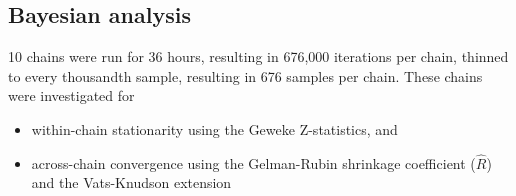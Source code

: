 \documentclass[]{article}
\begin{document}
\subsection{Bayesian analysis}
10 chains were run for 36 hours, resulting in 676,000 iterations per chain, thinned to every thousandth sample, resulting in 676 samples per chain. These chains were investigated for 
\begin{itemize}
	\item within-chain stationarity using the Geweke Z-statistics, and
	\item across-chain convergence using the Gelman-Rubin shrinkage coefficient ($\hat{R}$) and the Vats-Knudson extension \citep[\emph{stable $\hat{R}$}][]{vats2018revisiting}
\end{itemize}

%

  
\end{document}

